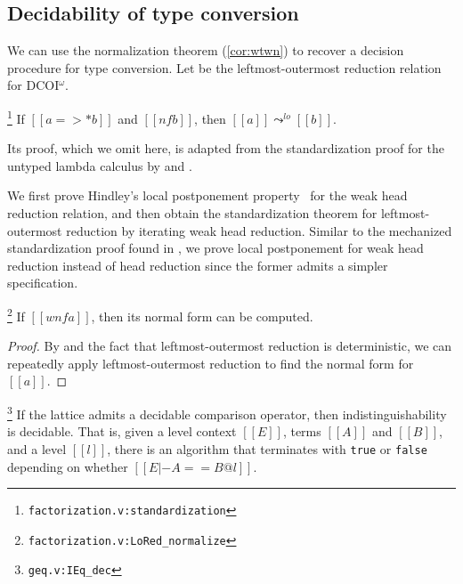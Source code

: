 \documentclass[acmsmall, screen=true, nonacm=true,
  review=\ifpublic false\else true\fi,
  anonymous=\ifanonymous true\else false\fi
]{acmart}
\makeatletter
\newcommand{\name}{\texorpdfstring{DCOI$^{\omega}$\@\xspace}{DCOI-omega}}
\newcommand{\suppl}[3]{{\scriptsize\texttt{#2:#3}}}
\newcommand{\judgement}[1]{{\setlength{\fboxsep}{1.5pt}\fbox{#1}}}
\newlength{\punctwidth}
\newcommand{\stack}[1]{%
  \settowidth{\punctwidth}{#1}%
  \hspace*{-\the\punctwidth}%
}
\makeatother
\begin{document}
\subsection{Decidability of type conversion}
\label{sec:decconv}

We can use the normalization theorem
(\cref{cor:wtwn}) to recover a decision procedure for type
conversion.
Let \judgement{$a \leadsto^{lo} b$} be the
leftmost-outermost reduction relation for \name.


\begin{lemma}[Standardization]
  \stack{.~}\footnote{\suppl{theories}{factorization.v}{standardization}}
  \label{lem:standardization}
  If $[[a =>* b]]$ and $[[nf b]]$, then $[[a]]\leadsto^{lo}[[b]]$.
\end{lemma}

Its proof, which we omit here,
is adapted from the standardization proof for the untyped lambda
calculus by \citet{takahashi:par} and \citet{accattoli:factorization}.

\ifextended
We first prove Hindley's local postponement property~\citep{accattoli:factorization}
for the weak head reduction relation, and then obtain the
standardization theorem for leftmost-outermost reduction by iterating
weak head reduction. Similar to the mechanized standardization proof
found in \citet{mckinna:some-lambda-formalized}, we prove local
postponement for weak head reduction instead of head reduction since
the former admits a simpler specification.
\fi

\begin{corollary}
  \stack{.~}\footnote{\suppl{theories}{factorization.v}{LoRed\_normalize}}
  \label{lem:nomdec}
  If $[[wnf a]]$, then its normal form can be computed.
\end{corollary}
\begin{proof}
  By  and the fact that
  leftmost-outermost reduction is deterministic, we can repeatedly
  apply leftmost-outermost reduction to find the normal form for $[[a]]$.
\end{proof}

\begin{lemma}
  \stack{.~}\footnote{\suppl{theories}{geq.v}{IEq\_dec}}
  \label{lem:indistdec}
  If the lattice admits a decidable comparison operator, then indistinguishability
  is decidable. That is, given a level context $[[E]]$, terms
  $[[A]]$ and $[[B]]$, and a level $[[l]]$, there is an algorithm that
  terminates with \texttt{true} or \texttt{false} depending on whether
  $[[E |- A == B @ l]]$.
\end{lemma}
\end{document}
